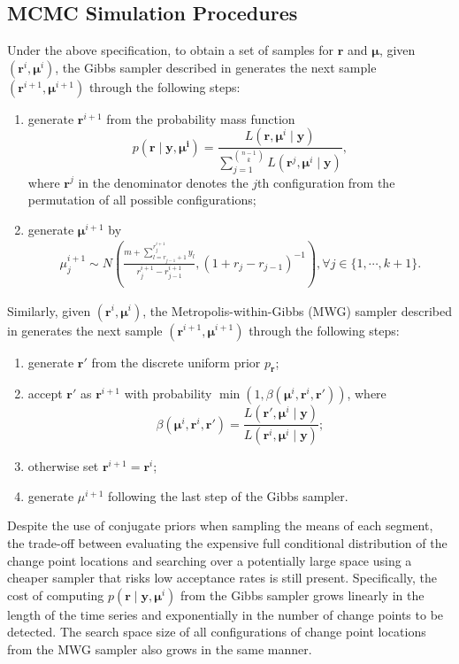 \subsection{MCMC Simulation Procedures}
Under the above specification, to obtain a set of samples for $\bm{r}$ and $\bm{\mu}$, given $\left(\bm{r}^i, \bm{\mu}^i\right)$, the Gibbs sampler described in \cite{carlin1992hierarchical} generates the next sample $\left(\bm{r}^{i+1}, \bm{\mu}^{i+1}\right)$ through the following steps:
\begin{enumerate}
\item generate $\bm{r}^{i+1}$ from the probability mass function
\[
p\left(\bm{r} \mid \bm{y}, \bm{\mu^i}\right) = \frac{L\left( \bm{r}, \bm{\mu}^i \mid \bm{y} \right)}{\sum_{j=1}^{\binom{n-1}{k}} L\left( \bm{r}^j, \bm{\mu}^i \mid \bm{y} \right)},
\]
where $\bm{r}^j$ in the denominator denotes the $j$th configuration from the permutation of all possible configurations;
\item generate $\bm{\mu}^{i+1}$ by
\begin{align} \label{eqn:post_mean}
\mu_j^{i+1} \sim N\left( \frac{m+\sum_{l=r_{j-1}+1}^{r_j^{i+1}}y_l}{r_j^{i+1} - r_{j-1}^{i+1}}, \left( 1 + r_j - r_{j-1} \right)^{-1} \right), \forall j \in \{ 1,\cdots, k+1 \}.
\end{align}
\end{enumerate}
Similarly, given $\left(\bm{r}^i, \bm{\mu}^i\right)$, the Metropolis-within-Gibbs (MWG) sampler described in \cite{antoch2008application} generates the next sample $\left(\bm{r}^{i+1}, \bm{\mu}^{i+1}\right)$ through the following steps:
\begin{enumerate}
\item generate $\bm{r}'$ from the discrete uniform prior $p_{\bm{r}}$;
\item accept $\bm{r}'$ as $\bm{r}^{i+1}$ with probability $\min\left(1, \beta\left( \bm{\mu}^i, \bm{r}^i, \bm{r}' \right) \right)$, where
\[
\beta\left( \bm{\mu}^i, \bm{r}^i, \bm{r}' \right) = \frac{L\left( \bm{r}', \bm{\mu}^i \mid \bm{y} \right)}{L\left( \bm{r}^i, \bm{\mu}^i \mid \bm{y} \right)};
\]
\item otherwise set $\bm{r}^{i+1} = \bm{r}^i$;
\item generate $\mu^{i+1}$ following the last step of the Gibbs sampler.
\end{enumerate}
Despite the use of conjugate priors when sampling the means of each segment, the trade-off between evaluating the expensive full conditional distribution of the change point locations and searching over a potentially large space using a cheaper sampler that risks low acceptance rates is still present. Specifically, the cost of computing $p\left(\bm{r} \mid \bm{y}, \bm{\mu}^i\right)$ from the Gibbs sampler grows linearly in the length of the time series and exponentially in the number of change points to be detected. The search space size of all configurations of change point locations from the MWG sampler also grows in the same manner.\\\\
